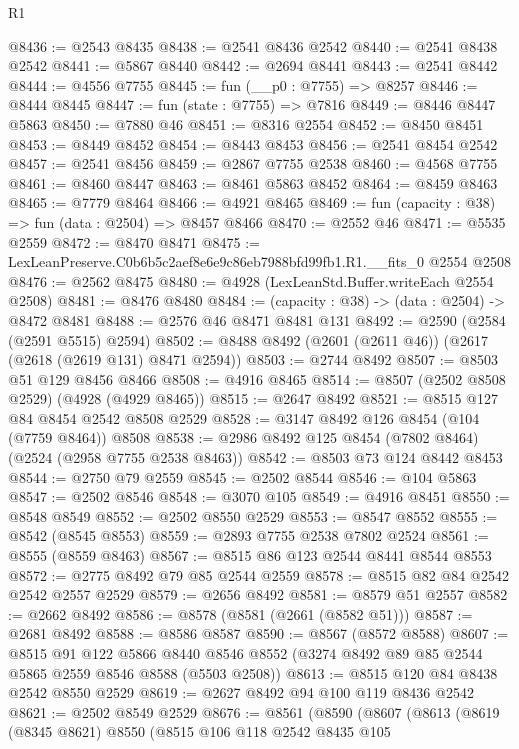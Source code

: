 \begin{lexlean}{R1}
\begin{coremodule}
@8436 := @2543 @8435
@8438 := @2541 @8436 @2542
@8440 := @2541 @8438 @2542
@8441 := @5867 @8440
@8442 := @2694 @8441
@8443 := @2541 @8442
@8444 := @4556 @7755
@8445 := fun (__p0 : @7755) => @8257
@8446 := @8444 @8445
@8447 := fun (state : @7755) => @7816
@8449 := @8446 @8447 @5863
@8450 := @7880 @46
@8451 := @8316 @2554
@8452 := @8450 @8451
@8453 := @8449 @8452
@8454 := @8443 @8453
@8456 := @2541 @8454 @2542
@8457 := @2541 @8456
@8459 := @2867 @7755 @2538
@8460 := @4568 @7755
@8461 := @8460 @8447
@8463 := @8461 @5863 @8452
@8464 := @8459 @8463
@8465 := @7779 @8464
@8466 := @4921 @8465
@8469 := fun (capacity : @38) => fun (data : @2504) => @8457 @8466
@8470 := @2552 @46
@8471 := @5535 @2559
@8472 := @8470 @8471
@8475 := LexLeanPreserve.C0b6b5c2aef8e6e9c86eb7988bfd99fb1.R1.__fits_0 @2554 @2508
@8476 := @2562 @8475
@8480 := @4928 (LexLeanStd.Buffer.writeEach @2554 @2508)
@8481 := @8476 @8480
@8484 := (capacity : @38) -> (data : @2504) -> @8472 @8481
@8488 := @2576 @46 @8471 @8481 @131
@8492 := @2590 (@2584 (@2591 @5515) @2594)
@8502 := @8488 @8492 (@2601 (@2611 @46)) (@2617 (@2618 (@2619 @131) @8471 @2594))
@8503 := @2744 @8492
@8507 := @8503 @51 @129 @8456 @8466
@8508 := @4916 @8465
@8514 := @8507 (@2502 @8508 @2529) (@4928 (@4929 @8465))
@8515 := @2647 @8492
@8521 := @8515 @127 @84 @8454 @2542 @8508 @2529
@8528 := @3147 @8492 @126 @8454 (@104 (@7759 @8464)) @8508
@8538 := @2986 @8492 @125 @8454 (@7802 @8464) (@2524 (@2958 @7755 @2538 @8463))
@8542 := @8503 @73 @124 @8442 @8453
@8544 := @2750 @79 @2559
@8545 := @2502 @8544
@8546 := @104 @5863
@8547 := @2502 @8546
@8548 := @3070 @105
@8549 := @4916 @8451
@8550 := @8548 @8549
@8552 := @2502 @8550 @2529
@8553 := @8547 @8552
@8555 := @8542 (@8545 @8553)
@8559 := @2893 @7755 @2538 @7802 @2524
@8561 := @8555 (@8559 @8463)
@8567 := @8515 @86 @123 @2544 @8441 @8544 @8553
@8572 := @2775 @8492 @79 @85 @2544 @2559
@8578 := @8515 @82 @84 @2542 @2542 @2557 @2529
@8579 := @2656 @8492
@8581 := @8579 @51 @2557
@8582 := @2662 @8492
@8586 := @8578 (@8581 (@2661 (@8582 @51)))
@8587 := @2681 @8492
@8588 := @8586 @8587
@8590 := @8567 (@8572 @8588)
@8607 := @8515
    @91
    @122
    @5866
    @8440
    @8546
    @8552
    (@3274 @8492 @89 @85 @2544 @5865 @2559 @8546 @8588 (@5503 @2508))
@8613 := @8515 @120 @84 @8438 @2542 @8550 @2529
@8619 := @2627 @8492 @94 @100 @119 @8436 @2542
@8621 := @2502 @8549 @2529
@8676 := @8561
    (@8590
      (@8607
        (@8613
          (@8619
            (@8345 @8621)
            @8550
            (@8515
              @106
              @118
              @2542
              @8435
              @105

\end{coremodule}
\end{lexlean}
